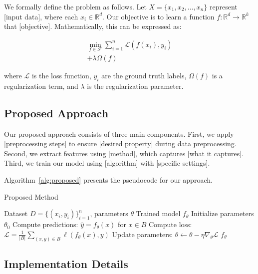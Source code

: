 \documentclass[12pt,a4paper]{article}
\theoremstyle{definition}
\theoremstyle{remark}
\begin{document}
We formally define the problem as follows. Let $X = \{x_1, x_2, \ldots, x_n\}$ represent [input data], where each $x_i \in \mathbb{R}^d$. Our objective is to learn a function $f: \mathbb{R}^d \rightarrow \mathbb{R}^k$ that [objective]. Mathematically, this can be expressed as:

\begin{equation}
\label{eq:objective}
\begin{split}
\min_{f \in \mathcal{F}} \sum_{i=1}^{n} \mathcal{L}(f(x_i), y_i) \\
+ \lambda \Omega(f)
\end{split}
\end{equation}

where $\mathcal{L}$ is the loss function, $y_i$ are the ground truth labels, $\Omega(f)$ is a regularization term, and $\lambda$ is the regularization parameter.

\subsection{Proposed Approach}
\label{subsec:approach}

Our proposed approach consists of three main components. First, we apply [preprocessing steps] to ensure [desired property] during data preprocessing. Second, we extract features using [method], which captures [what it captures]. Third, we train our model using [algorithm] with [specific settings].

Algorithm~\ref{alg:proposed} presents the pseudocode for our approach.

\begin{algorithm}
\caption{Proposed Method}
\label{alg:proposed}
\begin{algorithmic}[1]
\Require Dataset $D = \{(x_i, y_i)\}_{i=1}^{n}$, parameters $\theta$
\Ensure Trained model $f_{\theta}$
\State Initialize parameters $\theta_0$
        \State Compute predictions: $\hat{y} = f_{\theta}(x)$ for $x \in B$
        \State Compute loss: $\mathcal{L} = \frac{1}{|B|}\sum_{(x,y) \in B} \ell(f_{\theta}(x), y)$
        \State Update parameters: $\theta \leftarrow \theta - \eta \nabla_{\theta}\mathcal{L}$
    \EndFor
\EndFor
\State \Return $f_{\theta}$
\end{algorithmic}
\end{algorithm}

\subsection{Implementation Details}
\label{subsec:implementation}
\end{document}
